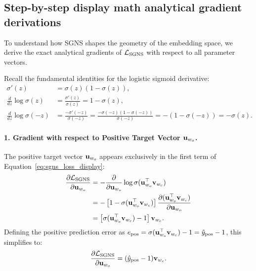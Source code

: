 \documentclass[../../main.tex]{subfiles}
\begin{document}
\subsection{Step-by-step display math analytical gradient derivations}
\label{subsec:sgns_gradients}

To understand how SGNS shapes the geometry of the embedding space, we derive the exact analytical gradients of $\mathcal{L}_{\text{SGNS}}$ with respect to all parameter vectors.

Recall the fundamental identities for the logistic sigmoid derivative:
\begin{align}
\label{eq:sigmoid_deriv_identity}
\sigma'(z) &= \sigma(z)(1 - \sigma(z)), \\
\label{eq:log_sigmoid_pos}
\frac{d}{dz} \log \sigma(z) &= \frac{\sigma'(z)}{\sigma(z)} = 1 - \sigma(z), \\
\label{eq:log_sigmoid_neg}
\frac{d}{dz} \log \sigma(-z) &= \frac{-\sigma'(-z)}{\sigma(-z)} = \frac{-\sigma(-z)(1 - \sigma(-z))}{\sigma(-z)} = -(1 - \sigma(-z)) = -\sigma(z).
\end{align}

\paragraph{1. Gradient with respect to Positive Target Vector $\mathbf{u}_{w_o}$.}
The positive target vector $\mathbf{u}_{w_o}$ appears exclusively in the first term of Equation~\eqref{eq:sgns_loss_display}:
\begin{align}
\frac{\partial \mathcal{L}_{\text{SGNS}}}{\partial \mathbf{u}_{w_o}} &= -\frac{\partial}{\partial \mathbf{u}_{w_o}} \log \sigma(\mathbf{u}_{w_o}^\top \mathbf{v}_{w_c}) \notag \\
&= -\left[ 1 - \sigma(\mathbf{u}_{w_o}^\top \mathbf{v}_{w_c}) \right] \frac{\partial (\mathbf{u}_{w_o}^\top \mathbf{v}_{w_c})}{\partial \mathbf{u}_{w_o}} \notag \\
\label{eq:grad_u_pos}
&= \left[ \sigma(\mathbf{u}_{w_o}^\top \mathbf{v}_{w_c}) - 1 \right] \mathbf{v}_{w_c}.
\end{align}
Defining the positive prediction error as $e_{\text{pos}} = \sigma(\mathbf{u}_{w_o}^\top \mathbf{v}_{w_c}) - 1 = \hat{y}_{\text{pos}} - 1$, this simplifies to:
\begin{equation}
\label{eq:grad_u_pos_clean}
\frac{\partial \mathcal{L}_{\text{SGNS}}}{\partial \mathbf{u}_{w_o}} = (\hat{y}_{\text{pos}} - 1) \mathbf{v}_{w_c}.
\end{equation}
\end{document}
